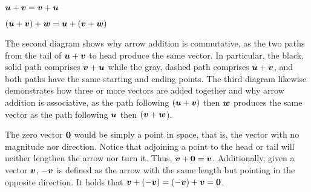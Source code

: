 \begin{Exam}
\begin{multicols}{3}
\begin{center}
\vfill $\boldsymbol u + \boldsymbol v = \boldsymbol v + \boldsymbol u$
\end{center}

\begin{center}
\end{center}
\vfill $(\boldsymbol u + \boldsymbol v) + \boldsymbol w = \boldsymbol u + (\boldsymbol v + \boldsymbol w)$
\end{multicols}
The second diagram shows why arrow addition is commutative, as the two paths from the tail of $\boldsymbol u+\boldsymbol v$ to head produce the same vector. In particular, the black, solid path comprises $\boldsymbol v+\boldsymbol u$ while the gray, dashed path comprises $\boldsymbol u+\boldsymbol v$, and both paths have the same starting and ending points. The third diagram likewise demonstrates how three or more vectors are added together and why arrow addition is associative, as the path following $(\boldsymbol u + \boldsymbol v)$ then $\boldsymbol w$ produces the same vector as the path following $\boldsymbol u$ then $(\boldsymbol v+\boldsymbol w$).

The zero vector $\boldsymbol 0$ would be simply a point in space, that is, the vector with no magnitude nor direction. Notice that adjoining a point to the head or tail will neither lengthen the arrow nor turn it. Thus, $\boldsymbol v+\boldsymbol 0 =\boldsymbol v$. Additionally, given a vector $\boldsymbol v$, $-\boldsymbol v$ is defined as the arrow with the same length but pointing in the opposite direction. It holds that $\boldsymbol v + (-\boldsymbol v) = (-\boldsymbol v) + \boldsymbol v = \boldsymbol 0$.
\begin{center}
\end{center}


\end{Exam}

